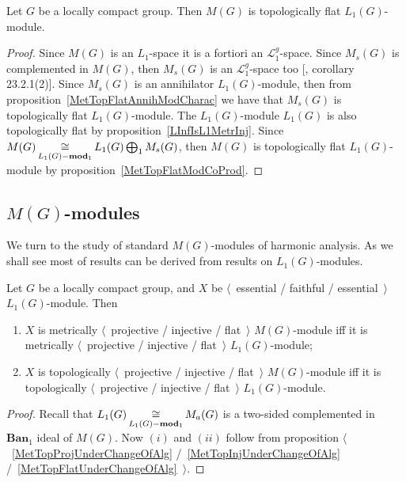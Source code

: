 \begin{proposition}\label{MeasAlgIsL1TopFlat} Let $G$ be a locally compact
group. Then $M(G)$ is topologically flat $L_1(G)$-module.
\end{proposition}
\begin{proof} Since $M(G)$ is an $L_1$-space it is a fortiori an
$\mathscr{L}_1^g$-space. Since $M_s(G)$ is complemented in $M(G)$, then $M_s(G)$
is an $\mathscr{L}_1^g$-space too [\cite{DefFloTensNorOpId}, corollary
23.2.1(2)]. Since $M_s(G)$ is an annihilator $L_1(G)$-module, then from
proposition~\ref{MetTopFlatAnnihModCharac} we have that $M_s(G)$ is
topologically flat $L_1(G)$-module. The $L_1(G)$-module $L_1(G)$ is also
topologically flat by proposition~\ref{LInfIsL1MetrInj}. Since
$M(G)\mathop{\mathbin{\cong}}\limits_{L_1(G)-\mathbf{mod}_1}L_1(G)\bigoplus_1 M_s(G)$, then $M(G)$ is
topologically flat $L_1(G)$-module by proposition~\ref{MetTopFlatModCoProd}.
\end{proof}


\subsection{
    \texorpdfstring{$M(G)$}{M (G)}-modules
}\label{SubSectionMGModules}

We turn to the study of standard $M(G)$-modules of harmonic analysis. As we
shall see most of results can be derived from results on $L_1(G)$-modules.

\begin{proposition}\label{MGMetTopProjInjFlatRedToL1} Let $G$ be a locally
compact group, and $X$ be $\langle$~essential / faithful / essential~$\rangle$
$L_1(G)$-module. Then

\begin{enumerate}[label = (\roman*)]
    \item $X$ is metrically $\langle$~projective / injective / flat~$\rangle$
    $M(G)$-module iff it is metrically $\langle$~projective / injective /
    flat~$\rangle$ $L_1(G)$-module;

    \item $X$ is topologically $\langle$~projective / injective / flat~$\rangle$
    $M(G)$-module iff it is topologically $\langle$~projective / injective /
    flat~$\rangle$ $L_1(G)$-module.
\end{enumerate}
\end{proposition}
\begin{proof} Recall that $L_1(G)\mathop{\mathbin{\cong}}\limits_{L_1(G)-\mathbf{mod}_1}M_a(G)$ is a
two-sided complemented in $\mathbf{Ban}_1$ ideal of $M(G)$. Now $(i)$ and $(ii)$
follow from proposition $\langle$~\ref{MetTopProjUnderChangeOfAlg}
/~\ref{MetTopInjUnderChangeOfAlg}  /~\ref{MetTopFlatUnderChangeOfAlg}~$\rangle$.
\end{proof} 

